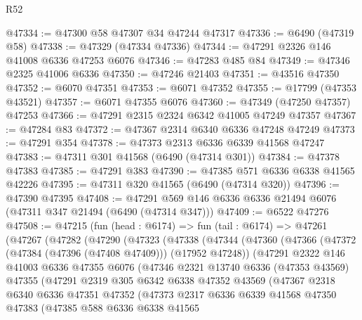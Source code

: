 \begin{lexlean}{R52}
\begin{coremodule}
@47334 := @47300 @58 @47307 @34 @47244 @47317
@47336 := @6490 (@47319 @58)
@47338 := @47329 (@47334 @47336)
@47344 := @47291 @2326 @146 @41008 @6336 @47253 @6076
@47346 := @47283 @485 @84
@47349 := @47346 @2325 @41006 @6336
@47350 := @47246 @21403
@47351 := @43516 @47350
@47352 := @6070 @47351
@47353 := @6071 @47352
@47355 := @17799 (@47353 @43521)
@47357 := @6071 @47355 @6076
@47360 := @47349 (@47250 @47357) @47253
@47366 := @47291 @2315 @2324 @6342 @41005 @47249 @47357
@47367 := @47284 @83
@47372 := @47367 @2314 @6340 @6336 @47248 @47249
@47373 := @47291 @354
@47378 := @47373 @2313 @6336 @6339 @41568 @47247
@47383 := @47311 @301 @41568 (@6490 (@47314 @301))
@47384 := @47378 @47383
@47385 := @47291 @383
@47390 := @47385 @571 @6336 @6338 @41565 @42226
@47395 := @47311 @320 @41565 (@6490 (@47314 @320))
@47396 := @47390 @47395
@47408 := @47291 @569 @146 @6336 @6336 @21494 @6076 (@47311 @347 @21494 (@6490 (@47314 @347)))
@47409 := @6522 @47276
@47508 := @47215
    (fun (head : @6174) =>
    fun (tail : @6174) =>
    @47261
      (@47267
        (@47282
          (@47290
            (@47323
              (@47338
                (@47344
                  (@47360
                    (@47366
                      (@47372 (@47384 (@47396 (@47408 @47409))) (@17952 @47248))
                      (@47291
                        @2322
                        @146
                        @41003
                        @6336
                        @47355
                        @6076
                        (@47346
                          @2321
                          @13740
                          @6336
                          (@47353 @43569)
                          @47355
                          (@47291
                            @2319
                            @305
                            @6342
                            @6338
                            @47352
                            @43569
                            (@47367
                              @2318
                              @6340
                              @6336
                              @47351
                              @47352
                              (@47373
                                @2317
                                @6336
                                @6339
                                @41568
                                @47350
                                @47383
                                (@47385
                                  @588
                                  @6336
                                  @6338
                                  @41565

\end{coremodule}
\end{lexlean}
